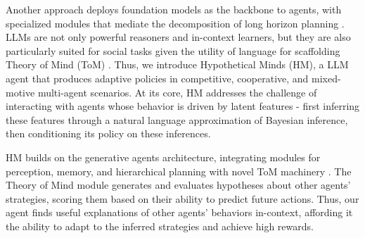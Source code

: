 \documentclass{article} %
\begin{document}
Another approach deploys foundation models as the backbone to agents, with specialized modules that mediate the decomposition of long horizon planning \citep{wang2024survey,wang2023voyager,brohan2023rt,park2023generative}. LLMs are not only powerful reasoners and in-context learners, but they are also particularly suited for social tasks given the utility of language for scaffolding Theory of Mind (ToM) \citep{astington2005language,de2007interface,de2021role, kosinski2023evaluating, gandhi2024understanding}. Thus, we introduce Hypothetical Minds (HM), a LLM agent that produces adaptive policies in competitive, cooperative, and mixed-motive multi-agent scenarios. At its core, HM addresses the challenge of interacting with agents whose behavior is driven by latent features - first inferring these features through a natural language approximation of Bayesian inference, then conditioning its policy on these inferences.


HM builds on the generative agents architecture, integrating modules for perception, memory, and hierarchical planning with novel ToM machinery \citep{park2023generative}. The Theory of Mind module generates and evaluates hypotheses about other agents' strategies, scoring them based on their ability to predict future actions. Thus, our agent finds useful explanations of other agents' behaviors in-context, affording it the ability to adapt to the inferred strategies and achieve high rewards.
\end{document}
